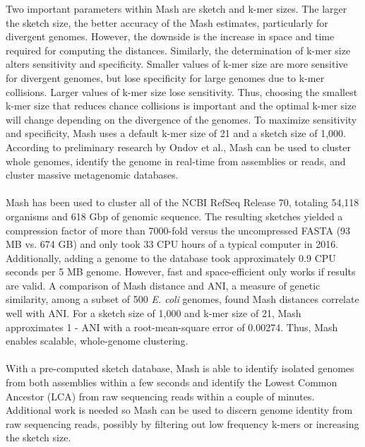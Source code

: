 \documentclass[12pt, letterpaper]{article}
\begin{document}
\FloatBarrier
Two important parameters within Mash are sketch and k-mer sizes. The larger the sketch size, the better accuracy of the Mash estimates, particularly for divergent genomes. However, the downside is the increase in space and time required for computing the distances. Similarly, the determination of k-mer size alters sensitivity and specificity. Smaller values of k-mer size are more sensitive for divergent genomes, but lose specificity for large genomes due to k-mer collisions. Larger values of k-mer size lose sensitivity. Thus, choosing the smallest k-mer size that reduces chance collisions is important and the optimal k-mer size will change depending on the divergence of the genomes. To maximize sensitivity and specificity, Mash uses a default k-mer size of 21 and a sketch size of 1,000. According to preliminary research by Ondov et al., Mash can be used to cluster whole genomes, identify the genome in real-time  from assemblies or reads, and cluster massive metagenomic databases. \\ \\
Mash has been used to cluster all of the NCBI RefSeq Release 70, totaling 54,118 organisms and 618 Gbp of genomic sequence. The resulting sketches yielded a compression factor of more than 7000-fold versus the uncompressed FASTA (93 MB vs. 674 GB) and only took 33 CPU hours of a typical computer in 2016.\cite{MinHash} Additionally, adding a genome to the database took approximately 0.9 CPU seconds per 5 MB genome. However, fast and space-efficient only works if results are valid. A comparison of Mash distance and ANI, a  measure of genetic similarity, among a subset of 500 \textit{E. coli} genomes, found Mash distances correlate well with ANI. For a sketch size of 1,000 and k-mer size of 21, Mash approximates 1 - ANI with a root-mean-square error of 0.00274. Thus, Mash enables scalable, whole-genome clustering. \\ \\
With a pre-computed sketch database, Mash is able to identify isolated genomes from both assemblies within a few seconds and identify the Lowest Common Ancestor (LCA) from raw sequencing reads within a couple of minutes. Additional work is needed so Mash can be used to discern genome identity from raw sequencing reads, possibly by filtering out low frequency k-mers or increasing the sketch size. \\ \\
\end{document}
